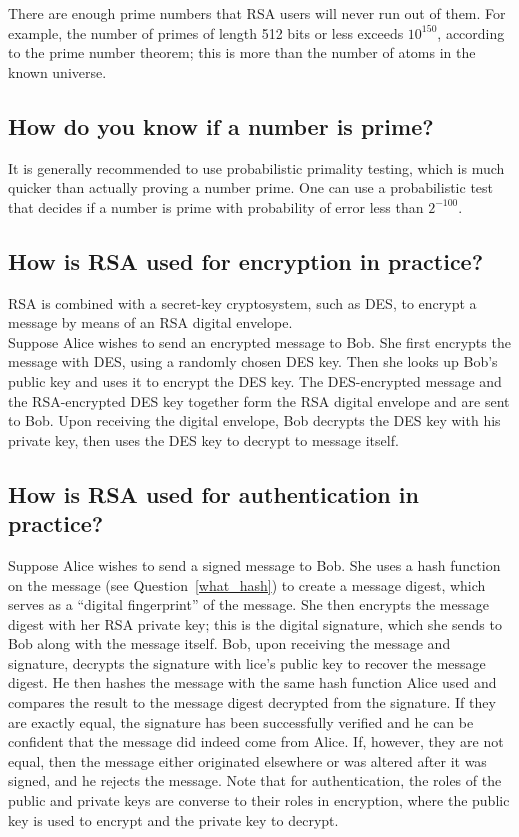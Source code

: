 There are enough prime numbers that RSA users will never run out of
them. For example, the number of primes of length 512 bits or less
exceeds $10^{150}$, according to the prime number theorem; this is more
than the number of atoms in the known universe.

\subsection{How do you know if a number is prime?}

It is generally recommended to use probabilistic primality testing,
which is much quicker than actually proving a number prime. One can use
a probabilistic test that decides if a number is prime with probability
of error less than $2^{-100}$.

\subsection{How is RSA used for encryption in practice?}
\label{how_rsa_prac}

RSA is combined with a secret-key cryptosystem, such as DES, to encrypt
a message by means of an RSA digital envelope.\\

Suppose Alice wishes to send an encrypted message to Bob. She first
encrypts the message with DES, using a randomly chosen DES key. Then
she looks up Bob's public key and uses it to encrypt the DES key. The
DES-encrypted message and the RSA-encrypted DES key together form the
RSA digital envelope and are sent to Bob. Upon receiving the digital
envelope, Bob decrypts the DES key with his private key, then uses the
DES key to decrypt to message itself.

\subsection{How is RSA used for authentication in practice?}
\label{how_rsa_auth_prac}

Suppose Alice wishes to send a signed message to Bob. She uses a hash
function on the message (see Question~\ref{what_hash}) to create a message
digest, which serves as a ``digital fingerprint'' of the message. She then
encrypts the message digest with her RSA private key; this is the digital
signature, which she sends to Bob along with the message itself. Bob, upon
receiving the message and signature, decrypts the signature with lice's
public key to recover the message digest. He then hashes the message with
the same hash function Alice used and compares the result to the message
digest decrypted from the signature. If they are exactly equal, the
signature has been successfully verified and he can be confident that the
message did indeed come from Alice. If, however, they are not equal, then
the message either originated elsewhere or was altered after it was signed,
and he rejects the message. Note that for authentication, the roles of the
public and private keys are converse to their roles in encryption, where
the public key is used to encrypt and the private key to decrypt.\\

